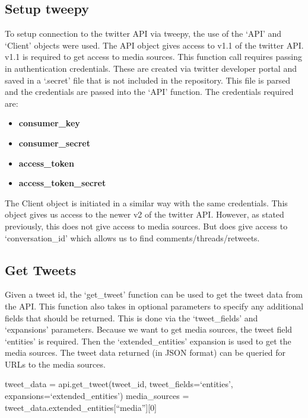 \subsection{Setup tweepy}
To setup connection to the twitter API via tweepy, the use of the `API' and `Client' objects were used. The API object gives access to v1.1 of the twitter API. v1.1 is 
required to get access to media sources. This function call requires passing in authentication credentials. These are created via twitter developer portal
and saved in a `.secret' file that is not included in the repository. This file is parsed and the credentials are passed into the `API' function. The
credentials required are:
\begin{itemize}
    \item \textbf{consumer\_key}
    \item \textbf{consumer\_secret}
    \item \textbf{access\_token}
    \item \textbf{access\_token\_secret}
\end{itemize}

The Client object is initiated in a similar way with the same credentials. This object gives us access to the newer v2 of the twitter API. However, as stated previously,
this does not give access to media sources. But does give access to `conversation\_id' which allows us to find comments/threads/retweets.
\subsection{Get Tweets}
Given a tweet id, the `get\_tweet' function can be used to get the tweet data from the API. This function also takes in optional parameters to specify any
additional fields that should be returned. This is done via the `tweet\_fields' and `expansions' parameters. Because we want to get media sources, the
tweet field `entities' is required. Then the `extended\_entities' expansion is used to get the media sources. The tweet data returned (in JSON format)
can be queried for URLs to the media sources.
\begin{algorithmic}
    \begin{algorithmic}
        \STATE tweet\_data = api.get\_tweet(tweet\_id, tweet\_fields=`entities', expansions=`extended\_entities')
        \STATE media\_sources = tweet\_data.extended\_entities[``media''][0]
    \end{algorithmic}
\end{algorithmic}


